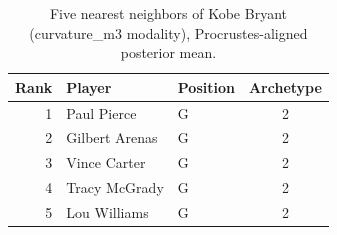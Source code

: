 \begin{table}[htbp]
  \centering\small
  \begin{tabular}{rllc}
    \toprule
    Rank & Player & Position & Archetype \\
    \midrule
    1 & Paul Pierce & G & 2 \\
    2 & Gilbert Arenas & G & 2 \\
    3 & Vince Carter & G & 2 \\
    4 & Tracy McGrady & G & 2 \\
    5 & Lou Williams & G & 2 \\
    \bottomrule
  \end{tabular}
  \caption{Five nearest neighbors of Kobe Bryant (curvature_m3 modality), Procrustes-aligned posterior mean.}
  \label{tab:Kobe_Bryant_neighbors_curvature_m3}
\end{table}

